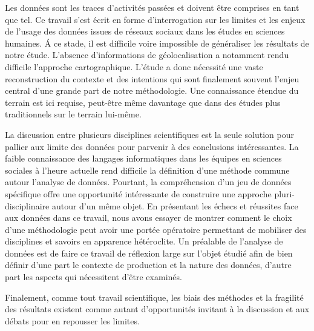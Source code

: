 Les données sont les traces d{\textquoteright}activités passées et doivent être comprises en tant que tel. Ce travail s'est écrit en forme d'interrogation sur les limites et les enjeux de l'usage des données issues de réseaux sociaux dans les études en sciences humaines. \'A ce stade, il est difficile voire impossible de généraliser les résultats de notre étude. L'absence d'informations de géolocalisation a notamment rendu difficile l'approche cartographique. L{\textquoteright}étude a donc nécessité une vaste reconstruction du contexte et des intentions qui sont finalement souvent l'enjeu central d'une grande part de notre méthodologie. Une connaissance étendue du terrain est ici requise, peut-être même davantage que dans des études plus traditionnels sur le terrain lui-même. 

La discussion entre plusieurs disciplines scientifiques est la seule solution pour pallier aux limite des données pour parvenir à des conclusions intéressantes. La faible connaissance des langages informatiques dans les équipes en sciences sociales à l'heure actuelle \citep{Wieviorka2013} rend difficile la définition d'une méthode commune autour l'analyse de données. Pourtant, la compréhension d'un jeu de données spécifique offre une opportunité intéressante de construire une approche pluri-disciplinaire autour d'un même objet. En présentant les échecs et réussites face aux données dans ce travail, nous avons essayer de montrer comment le choix d'une méthodologie peut avoir une portée opératoire permettant de mobiliser des disciplines et savoirs en apparence hétéroclite. Un préalable de l'analyse de données est de faire ce travail de réflexion large sur l'objet étudié afin de bien définir d'une part le contexte de production et la nature des données, d'autre part les aspects qui nécessitent d'être examinés.


Finalement, comme tout travail scientifique, les biais des méthodes et la fragilité des résultats existent comme autant d'opportunités invitant à la discussion et aux débats pour en repousser les limites.

